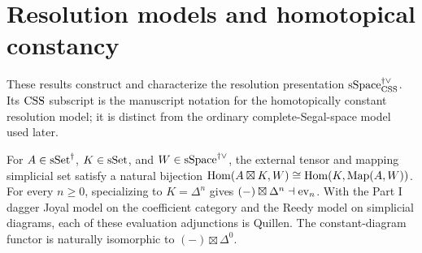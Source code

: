 \section{Resolution models and homotopical constancy}

These results construct and characterize the resolution presentation $\mathrm{sSpace}^{\dag\vee}_{\mathrm{CSS}}$. Its $\mathrm{CSS}$ subscript is the manuscript notation for the homotopically constant resolution model; it is distinct from the ordinary complete-Segal-space model used later.

\begin{resultblock}
\begin{proposition}
\label{catalogue:A1}
For $A\in\mathrm{sSet}^{\dag}$, $K\in\mathrm{sSet}$, and $W\in\mathrm{sSpace}^{\dag\vee}$, the external tensor and mapping simplicial set satisfy a natural bijection $\operatorname{Hom}(A\boxtimes K,W)\cong\operatorname{Hom}(K,\operatorname{Map}(A,W))$.
For every $n\geq0$, specializing to $K=\Delta^n$ gives $(-)\boxtimes\Delta^n\dashv\operatorname{ev}_n$.
With the Part I dagger Joyal model on the coefficient category and the Reedy model on simplicial diagrams, each of these evaluation adjunctions is Quillen.
The constant-diagram functor is naturally isomorphic to $(-)\boxtimes\Delta^0$.
\end{proposition}

\end{resultblock}


